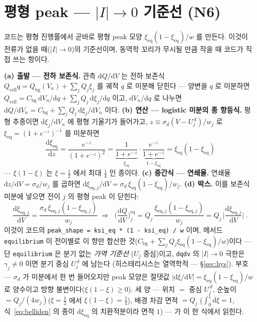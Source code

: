 \documentclass[11pt,a4paper]{article}
\newcommand{\dd}{\mathrm{d}}
\newcommand{\eq}{\mathrm{eq}}
\newcommand{\cell}{\mathrm{cell}}
\newcommand{\bg}{\mathrm{bg}}
\newcommand{\code}[1]{\texttt{#1}}
\begin{document}
\section{평형 peak — $|I|\to0$ 기준선 (N6)}\label{sec:eqpeak}
코드는 평형 진행률에서 곧바로 평형 peak 모양 $\xi_\eq(1-\xi_\eq)/w$ 를 만든다. 이것이 전류가 없을 때($|I|\to0$)의
기준선이며, 동역학 꼬리가 무시될 만큼 작을 때 코드가 직접 쓰는 항이다.

\textbf{(a) 출발 — 전하 보존식.} 관측 $\dd Q/\dd V$ 는 전하 보존식 $Q_\cell q=Q_\bg(V_n)+\sum_jQ_j\xi_j$ 를 궤적
$q$ 로 미분해 닫힌다 — 양변을 $q$ 로 미분하면 $Q_\cell=C_\bg\,\dd V_n/\dd q+\sum_jQ_j\,\dd\xi_j/\dd q$ 이고,
$\dd V_n/\dd q$ 로 나누면 $\dd Q/\dd V_n=C_\bg+\sum_jQ_j\,\dd\xi_j/\dd V_n$ 이다. \textbf{(b) 연산 — logistic
미분의 종 항등식.} 평형 추종이면 $\dd\xi_j/\dd V_n$ 에 평형 기울기가 들어가고, $z\equiv\sigma_d(V-U_j^{\,d})/w_j$ 로
$\xi_\eq=(1+e^{-z})^{-1}$ 를 미분하면
\begin{equation}
\frac{\dd\xi_\eq}{\dd z}=\frac{e^{-z}}{(1+e^{-z})^2}
=\underbrace{\frac{1}{1+e^{-z}}}_{\xi_\eq}\cdot\underbrace{\frac{e^{-z}}{1+e^{-z}}}_{1-\xi_\eq}
=\xi_\eq(1-\xi_\eq)
\label{eq:belliden}
\end{equation}
— $\xi(1-\xi)$ 는 $\xi=\tfrac12$ 에서 최대 $\tfrac14$ 인 종이다. \textbf{(c) 중간식 — 연쇄율.} 연쇄율
$\dd z/\dd V=\sigma_d/w_j$ 를 곱하면 $\dd\xi_{\eq,j}/\dd V=\sigma_d\,\xi_\eq(1-\xi_\eq)/w_j$. \textbf{(d) 박스.}
이를 보존식 미분에 넣으면 전이 $j$ 의 평형 peak 이 닫힌다:
\begin{equation}
\frac{\dd\xi_{\eq,j}}{\dd V}=\frac{\sigma_d\,\xi_{\eq,j}(1-\xi_{\eq,j})}{w_j}
\;\Longrightarrow\;
\boxed{\;\Big(\frac{\dd Q}{\dd V}\Big)^\eq_j
=Q_j\,\frac{\xi_{\eq,j}(1-\xi_{\eq,j})}{w_j}
=Q_j\,\Big|\frac{\dd\xi_{\eq,j}}{\dd V}\Big|\;.}
\label{eq:eqpeak}
\end{equation}
이것이 코드의 \code{peak\_shape = ksi\_eq * (1 - ksi\_eq) / w} 이며, 메서드 \code{equilibrium} 이 전이별로 이 항만
합산한 것($C_\bg+\sum_jQ_j\xi_\eq(1-\xi_\eq)/w$)이다 --- 단 \code{equilibrium} 은 분기 없는 \emph{가역 기준선}
($U_j$ 중심)이고, \code{dqdv} 의 $|I|\to0$ 극한은 $\gamma_j\ne0$ 이면 분기 중심 $U_j^{\,d}$ 에 남는다
(히스테리시스는 열역학적 — \S\ref{sec:hys}). 부호 — $\sigma_d$ 가 미분에서 한 번 들어오지만 peak 모양은
절댓값 $|\dd\xi/\dd V|=\xi_\eq(1-\xi_\eq)/w$ 로 양수이고 방향 불변이다($\xi(1-\xi)\ge0$). 세 양 — 위치 $=$ 중심
$U_j^{\,d}$, 순높이 $=Q_j/(4w_j)$($\xi=\tfrac12$ 에서 $\xi(1-\xi)=\tfrac14$), 배경 차감 면적 $=Q_j$
($\int_0^1\dd\xi=1$, 식~\eqref{eq:belliden} 의 종이 $\dd\xi_\eq$ 의 치환적분이라 면적 $1$) — 가 이 한 식에서 읽힌다.
\end{document}
